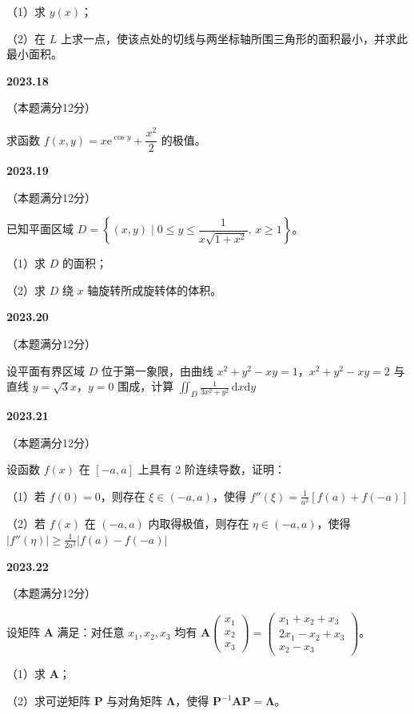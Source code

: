 \documentclass[UTF8,12pt,fontset=windows]{ctexart}
\begin{document}
（1）求 $y(x)$；

（2）在 $L$ 上求一点，使该点处的切线与两坐标轴所围三角形的面积最小，并求此最小面积。

\vfill
\newpage
{\large\bfseries 2023.18}

（本题满分12分）

求函数 $f(x,y) = x\mathrm{e}^{\cos y} + \dfrac{x^2}{2}$ 的极值。

\vfill
\newpage
{\large\bfseries 2023.19}

（本题满分12分）

已知平面区域 $D = \left\{(x,y) \mid 0 \leqslant y \leqslant \dfrac{1}{x\sqrt{1+x^2}},\, x \geqslant 1\right\}$。

（1）求 $D$ 的面积；

（2）求 $D$ 绕 $x$ 轴旋转所成旋转体的体积。

\vfill
\newpage
{\large\bfseries 2023.20}

（本题满分12分）

设平面有界区域 $D$ 位于第一象限，由曲线 $x^2 + y^2 - xy = 1$，$x^2 + y^2 - xy = 2$ 与直线 $y = \sqrt{3}x$，$y = 0$ 围成，计算 $\iint_D \frac{1}{3x^2 + y^2}\,\mathrm{d}x\mathrm{d}y$

\vfill
\newpage
{\large\bfseries 2023.21}

（本题满分12分）

设函数 $f(x)$ 在 $[-a, a]$ 上具有 2 阶连续导数，证明：

（1）若 $f(0) = 0$，则存在 $\xi \in (-a, a)$，使得 $f''(\xi) = \frac{1}{a^2}[f(a) + f(-a)]$

（2）若 $f(x)$ 在 $(-a, a)$ 内取得极值，则存在 $\eta \in (-a, a)$，使得 $|f''(\eta)| \geqslant \frac{1}{2a^2}|f(a) - f(-a)|$

\vfill
\newpage
{\large\bfseries 2023.22}

（本题满分12分）

设矩阵 $\boldsymbol{A}$ 满足：对任意 $x_1, x_2, x_3$ 均有 $\boldsymbol{A}\begin{pmatrix} x_1 \\ x_2 \\ x_3 \end{pmatrix} = \begin{pmatrix} x_1 + x_2 + x_3 \\ 2x_1 - x_2 + x_3 \\ x_2 - x_3 \end{pmatrix}$。

（1）求 $\boldsymbol{A}$；

（2）求可逆矩阵 $\boldsymbol{P}$ 与对角矩阵 $\boldsymbol{\Lambda}$，使得 $\boldsymbol{P}^{-1}\boldsymbol{A}\boldsymbol{P} = \boldsymbol{\Lambda}$。

\vfill
\end{document}

